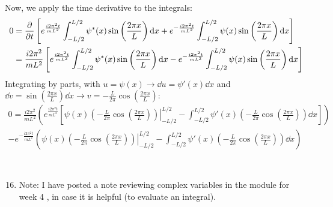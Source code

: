 \documentclass[12pt]{article}
\begin{document}
Now, we apply the time derivative to the integrals:
\begin{equation}
  \begin{aligned}
    0&=\pdv{t}\left[e^{\frac{i2\pi^2t}{mL^2}}\int_{-L / 2}^{L / 2} \psi^*(x)\sin\left(\frac{2\pi x}{L}\right)\dd{x}+e^{-\frac{i2\pi^2t}{mL^2}}\int_{-L / 2}^{L / 2} \psi(x)\sin\left(\frac{2\pi x}{L}\right) \dd{x}\right]\\
    &=\frac{i2\pi^2}{mL^2}\left[e^{\frac{i2\pi^2t}{mL^2}}\int_{-L / 2}^{L / 2} \psi^*(x)\sin\left(\frac{2\pi x}{L}\right)\dd{x}-e^{-\frac{i2\pi^2t}{mL^2}}\int_{-L / 2}^{L / 2} \psi(x)\sin\left(\frac{2\pi x}{L}\right) \dd{x}\right]\\
\end{aligned}
\end{equation}
Integrating by parts, with $u = \psi(x)\rightarrow \dd{u} = \psi'(x)\dd{x}$ and $\dd{v} = \sin\left(\frac{2\pi x}{L}\right)\dd{x}\rightarrow v = -\frac{L}{2\pi}\cos\left(\frac{2\pi x}{L}\right)$:
\begin{equation}
  \begin{aligned}
    0 = \frac{i2\pi^2}{mL^2}\left(e^{\frac{i2\pi^2t}{mL^2}}\left[\left.\psi(x)\left(-\frac{L}{2\pi}\cos\left(\frac{2\pi x}{L}\right)\right)\right|_{-L / 2}^{L / 2}-\int_{-L / 2}^{L / 2} \psi'(x)\left(-\frac{L}{2\pi}\cos\left(\frac{2\pi x}{L}\right)\right)\dd{x}\right]\right)\\
    -e^{-\frac{i2\pi^2t}{mL^2}}\left(\left.\psi(x)\left(-\frac{L}{2\pi}\cos\left(\frac{2\pi x}{L}\right)\right)\right|_{-L / 2}^{L / 2}-\int_{-L / 2}^{L / 2} \psi'(x)\left(-\frac{L}{2\pi}\cos\left(\frac{2\pi x}{L}\right)\right)\dd{x}\right)\\
  \end{aligned}
\end{equation}
\section{}
\begin{enumerate}
  \setcounter{enumi}{15}
  \item Note: I have posted a note reviewing complex variables in the module for week 4 , in case it is helpful (to evaluate an integral).
\end{enumerate}
\end{document}
